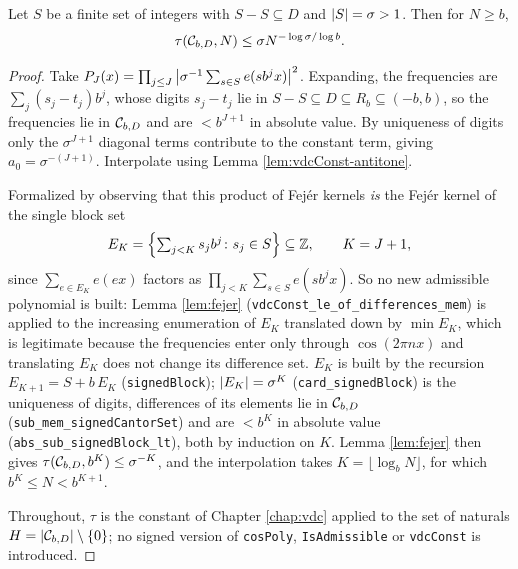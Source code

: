 \begin{theorem}[Proposition 3.7]
  \label{thm:powerSavings}
  \leanok
  Let $S$ be a finite set of integers with $S - S \subseteq D$ and
  $\left\lvert S \right\rvert = \sigma > 1$. Then for $N \geq b$,
  \[
    \tau(\mathcal{C}_{b,D}, N) \leq \sigma N^{-\log \sigma / \log b} .
  \]
\end{theorem}
\begin{proof}
  \leanok
  Take $P_J(x) = \prod_{j \leq J} \left\lvert \sigma^{-1}\sum_{s \in S}
  e(s b^j x) \right\rvert^2$. Expanding, the frequencies are $\sum_j (s_j - t_j) b^j$,
  whose digits $s_j - t_j$ lie in $S - S \subseteq D \subseteq R_b
  \subseteq (-b, b)$, so the frequencies lie in $\mathcal{C}_{b,D}$ and are
  $< b^{J+1}$ in absolute value. By uniqueness of digits only the
  $\sigma^{J+1}$ diagonal terms contribute to the constant term, giving
  $a_0 = \sigma^{-(J+1)}$. Interpolate using
  Lemma \ref{lem:vdcConst-antitone}.

  Formalized by observing that this product of Fej\'er kernels \emph{is} the
  Fej\'er kernel of the single block set
  \[
    E_K = \Bigl\{ \textstyle\sum_{j<K} s_j b^j \colon s_j \in S \Bigr\}
    \subseteq \mathbb{Z}, \qquad K = J+1,
  \]
  since $\sum_{e \in E_K} e(ex)$ factors as
  $\prod_{j<K} \sum_{s \in S} e(s b^j x)$.  So no new admissible polynomial is
  built: Lemma \ref{lem:fejer} (\texttt{vdcConst\_le\_of\_differences\_mem})
  is applied to the increasing enumeration of $E_K$ translated down by
  $\min E_K$, which is legitimate because the frequencies enter only through
  $\cos(2\pi n x)$ and translating $E_K$ does not change its difference set.
  $E_K$ is built by the recursion $E_{K+1} = S + b\,E_K$
  (\texttt{signedBlock}); $\left\lvert E_K \right\rvert = \sigma^K$
  (\texttt{card\_signedBlock}) is the uniqueness of digits, differences of
  its elements lie in $\mathcal{C}_{b,D}$ (\texttt{sub\_mem\_signedCantorSet}) and are
  $< b^K$ in absolute value (\texttt{abs\_sub\_signedBlock\_lt}), both by
  induction on $K$.  Lemma \ref{lem:fejer} then gives
  $\tau(\mathcal{C}_{b,D}, b^K) \leq \sigma^{-K}$, and the interpolation takes
  $K = \lfloor \log_b N \rfloor$, for which $b^K \leq N < b^{K+1}$.

  Throughout, $\tau$ is the constant of Chapter \ref{chap:vdc} applied to the
  set of naturals $H = \left\lvert \mathcal{C}_{b,D} \right\rvert \setminus \{0\}$; no signed version of
  \texttt{cosPoly}, \texttt{IsAdmissible} or \texttt{vdcConst} is introduced.
\end{proof}

